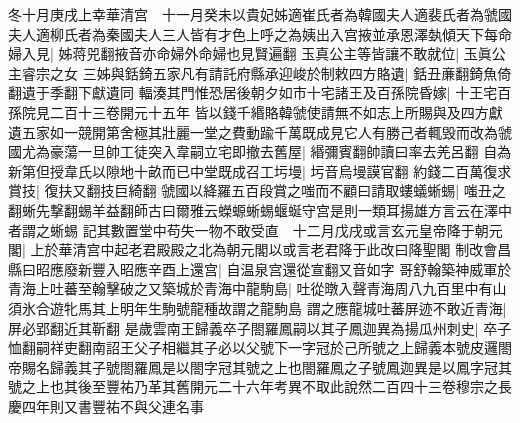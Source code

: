 冬十月庚戌上幸華清宫　十一月癸未以貴妃姊適崔氏者為韓國夫人適裴氏者為虢國夫人適柳氏者為秦國夫人三人皆有才色上呼之為姨出入宫掖並承恩澤埶傾天下每命婦入見|{
	姊蒋兕翻掖音亦命婦外命婦也見賢遍翻}
玉真公主等皆讓不敢就位|{
	玉眞公主睿宗之女}
三姊與銛錡五家凡有請託府縣承迎峻於制敕四方賂遺|{
	銛丑亷翻錡魚倚翻遺于季翻下獻遺同}
輻湊其門惟恐居後朝夕如市十宅諸王及百孫院昏嫁|{
	十王宅百孫院見二百十三卷開元十五年}
皆以錢千緡賂韓虢使請無不如志上所賜與及四方獻遺五家如一競開第舍極其壯麗一堂之費動踰千萬既成見它人有勝己者輒毁而改為虢國尤為豪蕩一旦帥工徒突入韋嗣立宅即撤去舊屋|{
	緡彌賓翻帥讀曰率去羌呂翻}
自為新第但授韋氏以隙地十畝而已中堂既成召工圬墁|{
	圬音烏墁謨官翻}
約錢二百萬復求賞技|{
	復扶又翻技巨綺翻}
虢國以絳羅五百段賞之嗤而不顧曰請取螻蟻蜥蜴|{
	嗤丑之翻蜥先撃翻蜴羊益翻師古曰爾雅云蠑螈蜥蜴蝘蜒守宫是則一類耳揚雄方言云在澤中者謂之蜥蜴}
記其數置堂中苟失一物不敢受直　十二月戊戌或言玄元皇帝降于朝元閣|{
	上於華清宫中起老君殿殿之北為朝元閣以或言老君降于此改曰降聖閣}
制改會昌縣曰昭應廢新豐入昭應辛酉上還宫|{
	自温泉宫還從宣翻又音如字}
哥舒翰築神威軍於青海上吐蕃至翰擊破之又築城於青海中龍駒島|{
	吐從暾入聲青海周八九百里中有山須氷合遊牝馬其上明年生駒號龍種故謂之龍駒島}
謂之應龍城吐蕃屏迹不敢近青海|{
	屏必郢翻近其靳翻}
是歲雲南王歸義卒子閤羅鳳嗣以其子鳳迦異為揚瓜州刺史|{
	卒子恤翻嗣祥吏翻南詔王父子相繼其子必以父號下一字冠於己所號之上歸義本號皮邏閤帝賜名歸義其子號閤羅鳳是以閤字冠其號之上也閤羅鳳之子號鳳迦異是以鳳字冠其號之上也其後至豐祐乃革其舊開元二十六年考異不取此說然二百四十三卷穆宗之長慶四年則又書豐祐不與父連名事}


